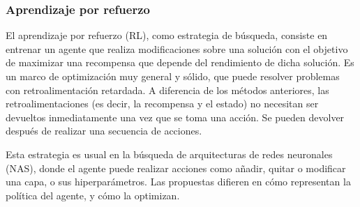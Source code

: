 \subsubsection{Aprendizaje por refuerzo}


El aprendizaje por refuerzo (RL), como estrategia de búsqueda, consiste en entrenar un agente que realiza modificaciones sobre una solución con el objetivo de maximizar una recompensa que depende del rendimiento de dicha solución. Es un marco de optimización muy general y sólido, que puede resolver problemas con retroalimentación retardada. A diferencia de los métodos anteriores, las retroalimentaciones (es decir, la recompensa y el estado) no necesitan ser devueltos inmediatamente una vez que se toma una acción. Se pueden devolver después de realizar una secuencia de acciones. 


Esta estrategia es usual en la búsqueda de arquitecturas de redes neuronales (NAS), donde el agente puede realizar acciones como añadir, quitar o modificar una capa, o sus hiperparámetros. Las propuestas difieren en cómo representan la política del agente, y cómo la optimizan.

